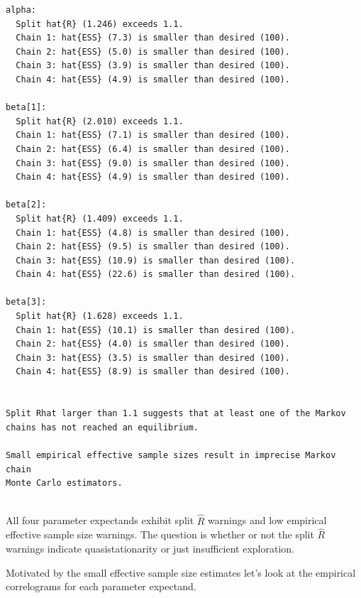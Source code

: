 \documentclass[
  letterpaper,
  DIV=11,
  numbers=noendperiod]{scrartcl}
\begin{document}
\begin{verbatim}
alpha:
  Split hat{R} (1.246) exceeds 1.1.
  Chain 1: hat{ESS} (7.3) is smaller than desired (100).
  Chain 2: hat{ESS} (5.0) is smaller than desired (100).
  Chain 3: hat{ESS} (3.9) is smaller than desired (100).
  Chain 4: hat{ESS} (4.9) is smaller than desired (100).

beta[1]:
  Split hat{R} (2.010) exceeds 1.1.
  Chain 1: hat{ESS} (7.1) is smaller than desired (100).
  Chain 2: hat{ESS} (6.4) is smaller than desired (100).
  Chain 3: hat{ESS} (9.0) is smaller than desired (100).
  Chain 4: hat{ESS} (4.9) is smaller than desired (100).

beta[2]:
  Split hat{R} (1.409) exceeds 1.1.
  Chain 1: hat{ESS} (4.8) is smaller than desired (100).
  Chain 2: hat{ESS} (9.5) is smaller than desired (100).
  Chain 3: hat{ESS} (10.9) is smaller than desired (100).
  Chain 4: hat{ESS} (22.6) is smaller than desired (100).

beta[3]:
  Split hat{R} (1.628) exceeds 1.1.
  Chain 1: hat{ESS} (10.1) is smaller than desired (100).
  Chain 2: hat{ESS} (4.0) is smaller than desired (100).
  Chain 3: hat{ESS} (3.5) is smaller than desired (100).
  Chain 4: hat{ESS} (8.9) is smaller than desired (100).


Split Rhat larger than 1.1 suggests that at least one of the Markov
chains has not reached an equilibrium.
 
Small empirical effective sample sizes result in imprecise Markov chain
Monte Carlo estimators.
 
\end{verbatim}

All four parameter expectands exhibit split \(\hat{R}\) warnings and low
empirical effective sample size warnings. The question is whether or not
the split \(\hat{R}\) warnings indicate quasistationarity or just
insufficient exploration.

Motivated by the small effective sample size estimates let's look at the
empirical correlograms for each parameter expectand.
\end{document}
